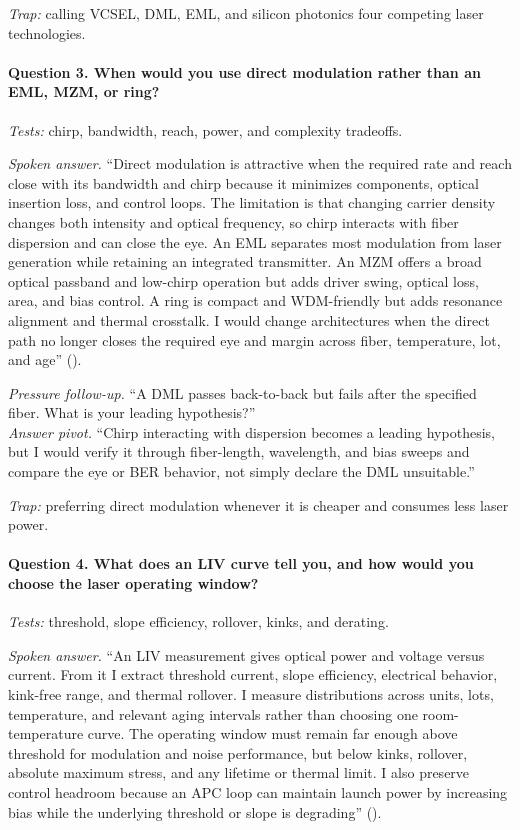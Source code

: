 \textit{Trap:} calling VCSEL, DML, EML, and silicon photonics four competing
laser technologies.

\paragraph{Question 3. When would you use direct modulation rather than an EML,
MZM, or ring?}
\textit{Tests:} chirp, bandwidth, reach, power, and complexity tradeoffs.

\textit{Spoken answer.}
``Direct modulation is attractive when the required rate and reach close with
its bandwidth and chirp because it minimizes components, optical insertion
loss, and control loops. The limitation is that changing carrier density
changes both intensity and optical frequency, so chirp interacts with fiber
dispersion and can close the eye. An EML separates most modulation from laser
generation while retaining an integrated transmitter. An MZM offers a broad
optical passband and low-chirp operation but adds driver swing, optical loss,
area, and bias control. A ring is compact and WDM-friendly but adds resonance
alignment and thermal crosstalk. I would change architectures when the direct
path no longer closes the required eye and margin across fiber, temperature,
lot, and age'' ().

\textit{Pressure follow-up.} ``A DML passes back-to-back but fails after the
specified fiber. What is your leading hypothesis?''\\
\textit{Answer pivot.} ``Chirp interacting with dispersion becomes a leading
hypothesis, but I would verify it through fiber-length, wavelength, and bias
sweeps and compare the eye or BER behavior, not simply declare the DML
unsuitable.''

\textit{Trap:} preferring direct modulation whenever it is cheaper and
consumes less laser power.

\paragraph{Question 4. What does an LIV curve tell you, and how would you choose
the laser operating window?}
\textit{Tests:} threshold, slope efficiency, rollover, kinks, and derating.

\textit{Spoken answer.}
``An LIV measurement gives optical power and voltage versus current. From it I
extract threshold current, slope efficiency, electrical behavior, kink-free
range, and thermal rollover. I measure distributions across units, lots,
temperature, and relevant aging intervals rather than choosing one
room-temperature curve. The operating window must remain far enough above
threshold for modulation and noise performance, but below kinks, rollover,
absolute maximum stress, and any lifetime or thermal limit. I also preserve
control headroom because an APC loop can maintain launch power by increasing
bias while the underlying threshold or slope is degrading''
().

